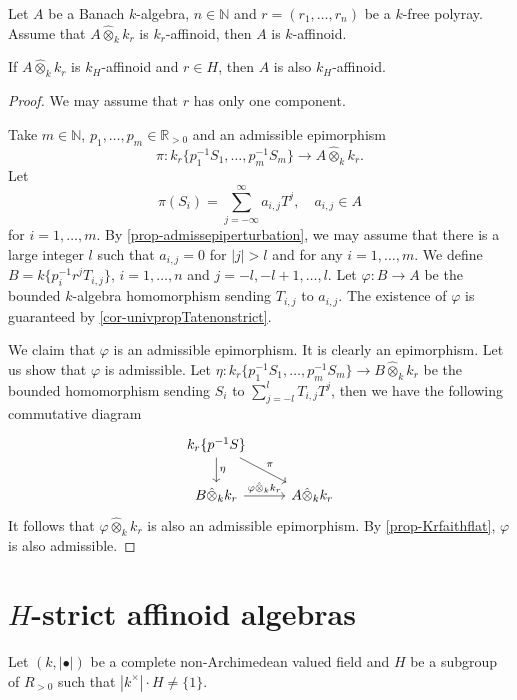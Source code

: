 \begin{corollary}\label{cor-affkhann}
    Let $A$ be a Banach $k$-algebra, $n\in \mathbb{N}$ and $r=(r_1,\ldots,r_n)$ be a $k$-free polyray. Assume that $A\hat{\otimes}_k k_r$ is $k_r$-affinoid, then $A$ is $k$-affinoid.

    If $A\hat{\otimes}_k k_r$ is $k_H$-affinoid and $r\in H$, then $A$ is also $k_H$-affinoid. 
\end{corollary}
\begin{proof}
    We may assume that $r$ has only one component.

    Take $m\in \mathbb{N}$, $p_1,\ldots,p_m\in \mathbb{R}_{>0}$ and an admissible epimorphism
    \[
        \pi:k_r\{p_1^{-1}S_1,\ldots,p_{m}^{-1}S_m\}\rightarrow  A\hat{\otimes}_k k_r. 
    \]
    Let 
    \[
        \pi(S_i)=\sum_{j=-\infty}^{\infty} a_{i,j}T^j,\quad a_{i,j}\in A  
    \]
    for $i=1,\ldots,m$. By \cref{prop-admissepiperturbation}, we may assume that there is a large integer $l$ such that $a_{i,j}=0$ for $|j|>l$ and for any $i=1,\ldots,m$. We define $B=k\{p_i^{-1}r^jT_{i,j}\}$, $i=1,\ldots,n$ and $j=-l,-l+1,\ldots,l$. Let $\varphi:B\rightarrow A$ be the bounded $k$-algebra homomorphism sending $T_{i,j}$ to $a_{i,j}$. The existence of $\varphi$ is guaranteed by \cref{cor-univpropTatenonstrict}.

    We claim that $\varphi$ is an admissible epimorphism. It is clearly an epimorphism. Let us show that $\varphi$ is admissible. Let $\eta:k_r\{p_1^{-1}S_1,\ldots,p_{m}^{-1}S_m\}\rightarrow B\hat{\otimes}_k k_r$ be the bounded homomorphism sending $S_i$ to $\sum_{j=-l}^l T_{i,j}T^j$, then we have the following commutative diagram
    \[
        \begin{tikzcd}
            k_r\{p^{-1}S\} \arrow[rd, "\pi"] \arrow[d, "\eta"]           &                      \\
            B\hat{\otimes}_k k_r \arrow[r, "\varphi\hat{\otimes}_k k_r"] & A\hat{\otimes}_k k_r
        \end{tikzcd}  
    \]
    It follows that $\varphi\hat{\otimes}_k k_r$ is also an admissible epimorphism. By  \cref{prop-Krfaithflat}, $\varphi$ is also admissible.
\end{proof}


\section{\texorpdfstring{$H$}{H}-strict affinoid algebras}
Let $(k,|\bullet|)$ be a complete non-Archimedean valued field and $H$ be a subgroup of $R_{>0}$ such that $|k^{\times}|\cdot H\neq \{1\}$.


